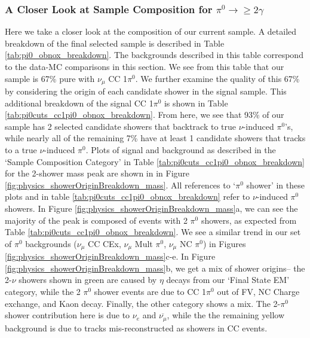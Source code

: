 \subsubsection{A Closer Look at Sample Composition for $\pi^0\rightarrow\geq 2 \gamma$}
Here we take a closer look at the composition of our current sample.  A detailed breakdown of the final selected sample is described in Table \ref{tab:pi0_obnox_breakdown}. The backgrounds described in this table correspond to the data-MC comparisons in this section. We see from this table that our sample is 67\% pure with $\nu_\mu$ CC 1$\pi^0$.  We further examine the quality of this 67\% by considering the origin of each candidate shower in the signal sample. This additional breakdown of the signal CC 1$\pi^0$ is shown in Table \ref{tab:pi0cuts_cc1pi0_obnox_breakdown}.  From here, we see that 93\% of our sample has 2 selected candidate showers that backtrack to true $\nu$-induced $\pi^0$'s, while nearly all of the remaining 7\% have at least 1 candidate showers that tracks to a true $\nu$-induced $\pi^0$.  Plots of signal and background as described in the `Sample Composition Category' in Table \ref{tab:pi0cuts_cc1pi0_obnox_breakdown} for the 2-shower mass peak are shown in in Figure \ref{fig:physics_showerOriginBreakdown_mass}. All references to `$\pi^0$ shower' in these plots and in table \ref{tab:pi0cuts_cc1pi0_obnox_breakdown} refer to $\nu$-induced $\pi^0$ showers.  In Figure \ref{fig:physics_showerOriginBreakdown_mass}a, we can see the majority of the peak is composed of events with 2 $\pi^0$ showers, as expected from Table \ref{tab:pi0cuts_cc1pi0_obnox_breakdown}. We see a similar trend in our set of $\pi^0$ backgrounds ($\nu_\mu$ CC CEx, $\nu_\mu$ Mult $\pi^0$, $\nu_\mu$ NC $\pi^0$) in Figures \ref{fig:physics_showerOriginBreakdown_mass}c-e.  In Figure \ref{fig:physics_showerOriginBreakdown_mass}b, we get a mix of shower origins-- the 2-$\nu$ showers shown in green are caused by $\eta$ decays from our `Final State EM' category, while the 2 $\pi^0$ shower events are due to CC 1$\pi^0$ out of FV, NC Charge exchange, and Kaon decay. Finally, the other category shows a mix.  The 2-$\pi^0$ shower contribution here is due to $\nu_e$ and $\overline{\nu_\mu}$, while the the remaining yellow background is due to tracks mis-reconstructed as showers in CC events.

